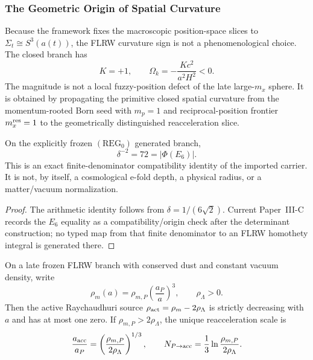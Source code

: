 \documentclass[12pt,a4paper]{article}
\begin{document}
\subsubsection{The Geometric Origin of Spatial Curvature}
\label{p8:sec:spatial_curvature}

Because the framework fixes the macroscopic position-space slices to \(\Sigma_t\cong S^3(a(t))\), the FLRW curvature sign is not a phenomenological choice.  The closed branch has
\begin{equation}
\label{p8:eq:omega-k-bridge}
K=+1,
\qquad
\Omega_k=-\frac{Kc^2}{a^2H^2}<0.
\end{equation}
The magnitude is not a local fuzzy-position defect of the late large-\(m_x\) sphere.  It is obtained by propagating the primitive closed spatial curvature from the momentum-rooted Born seed with \(m_p=1\) and reciprocal-position frontier \(m_x^{\rm res}=1\) to the geometrically distinguished reacceleration slice.

\begin{theorem}
\label{p8:thm:imported-one-sided-trace-72}
On the explicitly frozen \((\mathrm{REG}_0)\) generated branch,
\[
\delta^{-2}=72=|\Phi(E_6)|.
\]
This is an exact finite-denominator compatibility identity of the imported
carrier.  It is not, by itself, a cosmological e-fold depth, a physical radius,
or a matter/vacuum normalization.
\end{theorem}

\begin{proof}
The arithmetic identity follows from \(\delta=1/(6\sqrt2)\).  Current
Paper~III-C records the \(E_6\) equality as a compatibility/origin check after
the determinant construction; no typed map from that finite denominator to an
FLRW homothety integral is generated there.
\end{proof}

\begin{lemma}
\label{p8:lem:signed-active-trace-pairing}
On a late frozen FLRW branch with conserved dust and constant vacuum density,
write
\[
 \rho_m(a)=\rho_{m,P}\left(\frac{a_P}{a}\right)^3,
 \qquad \rho_\Lambda>0.
\]
Then the active Raychaudhuri source
\(\rho_{\rm act}=\rho_m-2\rho_\Lambda\) is strictly decreasing with \(a\)
and has at most one zero.  If \(\rho_{m,P}>2\rho_\Lambda\), the unique
reacceleration scale is
\begin{equation}
\label{p8:eq:exact-aacc-dust-vacuum}
 \frac{a_{\rm acc}}{a_P}
 =\left(\frac{\rho_{m,P}}{2\rho_\Lambda}\right)^{1/3},
 \qquad
 N_{P\to{\rm acc}}
 =\frac13\ln\frac{\rho_{m,P}}{2\rho_\Lambda}.
\end{equation}
\end{lemma}
\end{document}
